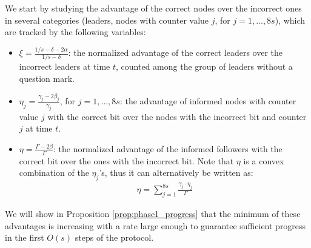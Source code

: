 \documentclass[a4paper,12pt]{article}
\begin{document}
We start by studying the advantage of the correct nodes over the incorrect ones in several categories (leaders, nodes with counter value $j$, for $j=1, \ldots, 8s$), which are tracked by the following variables:
\begin{itemize}
	\item $\xi = \frac{1/s - \delta - 2\alpha}{1/s - \delta}$: the normalized advantage of the correct leaders over the incorrect leaders at time $t$, counted among the group of leaders without a question mark.
	\item $\eta_j = \frac{\gamma_j - 2 \beta_j}{\gamma_j}$, for $j = 1, \ldots, 8s$: the advantage of informed nodes with counter value $j$ with the correct bit over the nodes with the incorrect bit and counter $j$ at time $t$.
	\item $\eta = \frac{\Gamma - 2\beta}{\Gamma}$: the normalized advantage of the informed followers with the correct bit over the ones with the incorrect bit. Note that $\eta$ is a convex combination of the $\eta_j$'s, thus it can alternatively be written as:
	\begin{align} \label{convex_y}
	\eta = \sum_{j=1}^{8s} \frac{\gamma_j \cdot \eta_j}{\Gamma }
	\end{align}
\end{itemize}

We will show in Proposition \ref{prop:phase1_progress} that the minimum of these advantages is increasing with a rate large enough to guarantee sufficient progress in the first $O(s)$ steps of the protocol.
\end{document}
